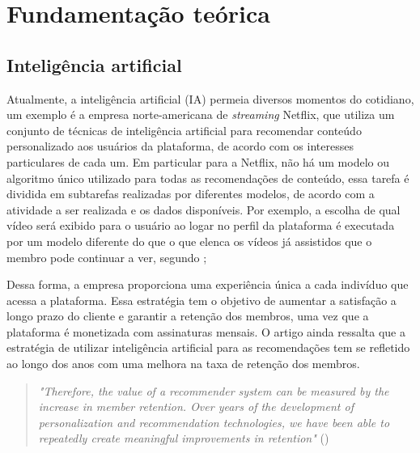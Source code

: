 
\chapter{Fundamentação teórica}

\section{Inteligência artificial}

Atualmente, a inteligência artificial (IA) permeia diversos 
momentos do cotidiano, um exemplo é a empresa norte-americana 
de \textit{streaming} Netflix, que utiliza um conjunto de 
técnicas de inteligência artificial para recomendar conteúdo personalizado aos 
usuários da plataforma, de acordo com os interesses 
particulares de cada um. Em particular para a Netflix, 
não há um modelo ou algoritmo único utilizado 
para todas as recomendações de conteúdo, essa tarefa é 
dividida em subtarefas realizadas por diferentes modelos, de 
acordo com a atividade a ser realizada e os dados disponíveis. 
Por exemplo, a escolha de qual vídeo será exibido para 
o usuário ao logar no perfil da plataforma é executada por um 
modelo  diferente do que o que elenca os vídeos já assistidos que o 
membro pode continuar a ver, segundo \citet{netflix};

Dessa forma, a empresa proporciona uma 
experiência única a cada indivíduo que acessa a plataforma. Essa 
estratégia tem o objetivo de aumentar a satisfação a longo prazo 
do cliente e garantir a retenção dos membros, uma vez 
que a plataforma é monetizada com assinaturas mensais. O artigo
ainda ressalta que a estratégia de utilizar inteligência 
artificial para as recomendações tem se refletido ao longo 
dos anos com uma melhora na taxa de retenção dos membros. 

\begin{quote}
  \textit{"Therefore, the value of a recommender system can be measured by
the increase in member retention. Over years of the development of personalization and recommendation technologies, we have been able to repeatedly create meaningful
improvements in retention"} (\cite{netflix})
\end{quote}


